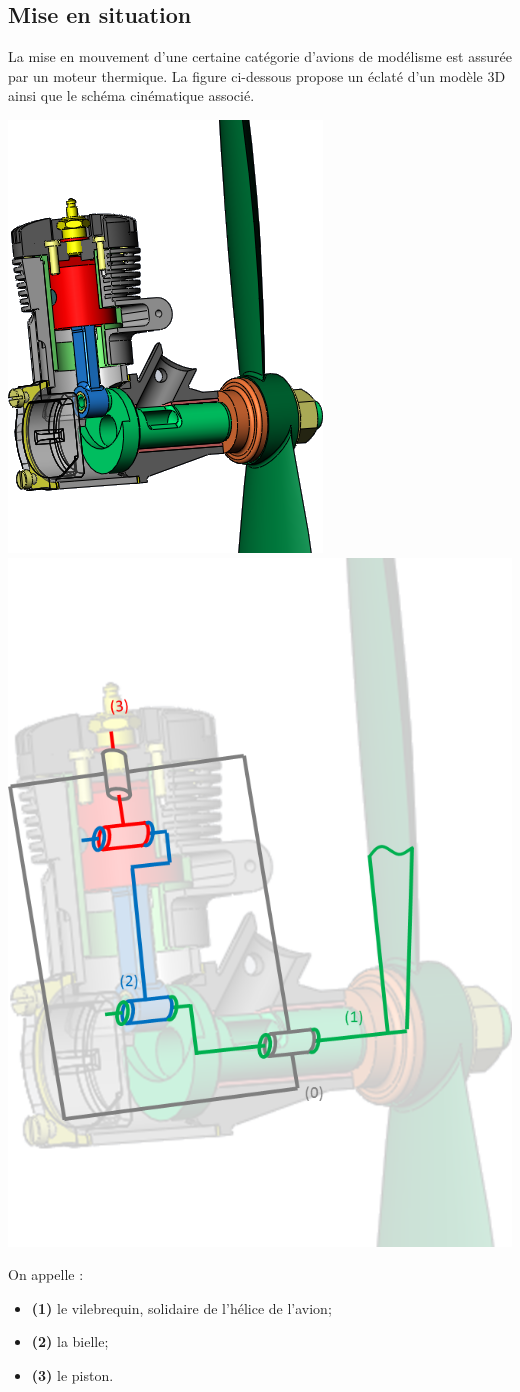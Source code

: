 \documentclass[10pt,fleqn]{article} %
\begin{document}

\vspace{4cm}
\pagestyle{fancy}
\thispagestyle{plain}
\begin{multicols}{2}

\section*{Mise en situation}
La mise en mouvement d'une certaine catégorie d'avions de modélisme est assurée par un moteur thermique.   La figure ci-dessous propose un éclaté d'un modèle 3D ainsi que le schéma cinématique associé. 

\begin{center}
\includegraphics[width=.45\linewidth]{images/fig_03}
\includegraphics[width=.45\linewidth]{images/fig_04}
\end{center}

On appelle : 
\begin{itemize}
\item \textbf{(1)} le vilebrequin, solidaire de l'hélice de l'avion;
\item \textbf{(2)} la bielle;
\item \textbf{(3)} le piston.
\end{itemize}


\end{multicols}
\end{document}
